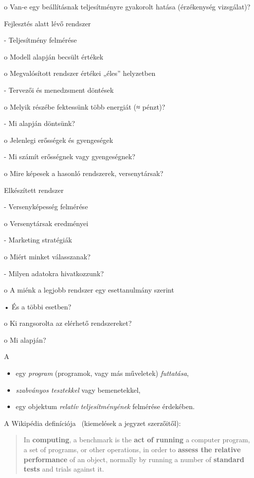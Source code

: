 o Van‐e egy beállításnak teljesítményre gyakorolt hatása 
(érzékenység vizsgálat)?

Fejlesztés alatt lévő rendszer

- Teljesítmény felmérése

o Modell alapján becsült értékek

o Megvalósított rendszer értékei „éles” helyzetben

- Tervezői és menedzsment döntések

o Melyik részébe fektessünk több energiát (≈ pénzt)? 

- Mi alapján döntsünk?

o Jelenlegi erősségek és gyengeségek

- Mi számít erősségnek vagy gyengeségnek?

o Mire képesek a hasonló rendszerek, versenytársak?

Elkészített rendszer

- Versenyképesség felmérése

o Versenytársak eredményei

- Marketing stratégiák

o Miért minket válasszanak?

- Milyen adatokra hivatkozzunk?

o A miénk a legjobb rendszer egy esettanulmány szerint

• És a többi esetben?

o Ki rangsorolta az elérhető rendszereket?

o Mi alapján?

\begin{definicio}
	A 
	\begin{itemize}
		\item egy \emph{program} (programok, vagy más műveletek) \emph{futtatása},
		\item \emph{szabványos tesztekkel} vagy bemenetekkel,
		\item egy objektum \emph{relatív teljesítményének} felmérése érdekében.
	\end{itemize}
\end{definicio}

A Wikipédia definíciója~\cite{wiki:benchmark} (kiemelések a jegyzet szerzőitől):

\begin{quote}
	In \textbf{computing}, a benchmark is the \textbf{act of running} a computer program, a set of programs, or other operations, in order to \textbf{assess the relative performance} of an object, normally by running a number of \textbf{standard tests} and trials against it.
\end{quote}

